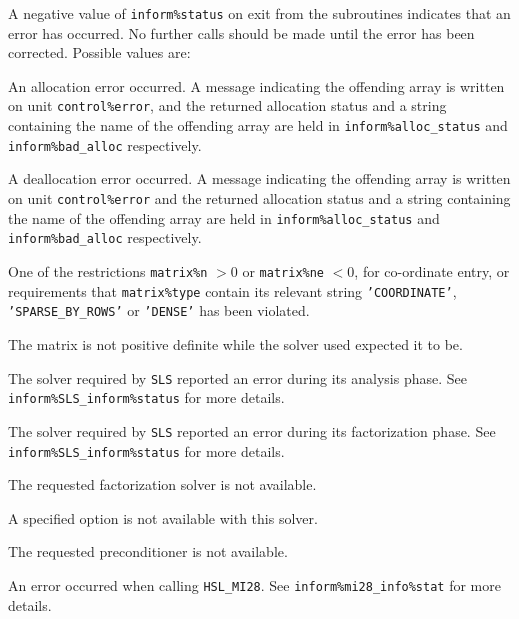 \documentclass{galahad}
\begin{document}

\galerrors
A negative value of {\tt inform\%status} on exit from the subroutines
indicates that an error has occurred. No further calls should be made
until the error has been corrected. Possible values are:

\begin{description}

\itt{\galerrallocate} An allocation error occurred. A message indicating
the offending
array is written on unit {\tt control\%error}, and the returned allocation
status and a string containing the name of the offending array
are held in {\tt inform\%alloc\_\-status}
and {\tt inform\%bad\_alloc} respectively.

\itt{\galerrdeallocate} A deallocation error occurred.
A message indicating the offending
array is written on unit {\tt control\%error} and the returned allocation
status and a string containing the name of the offending array
are held in {\tt inform\%alloc\_\-status}
and {\tt inform\%bad\_alloc} respectively.

\itt{\galerrrestrictions} One of the restrictions
 {\tt matrix\%n} $> 0$ or
 {\tt matrix\%ne} $< 0$, for co-ordinate entry,
  or requirements that {\tt matrix\%type}
  contain its relevant string
{\tt 'COORDINATE'}, {\tt 'SPARSE\_BY\_ROWS'} or   {\tt 'DENSE'}
  has been violated.

\itt{\galerrinertia} The matrix is not positive definite while the solver
  used expected it to be.

\itt{\galerranalysis} The solver required by {\tt SLS} reported an
  error during its analysis phase. 
  See {\tt inform\%SLS\_inform\%status} for more details.

\itt{\galerrfactorization} The solver required by {\tt SLS} reported an
  error during its factorization phase. 
  See {\tt inform\%SLS\_inform\%status} for more details.

\itt{\galunknownsolver} The requested factorization solver is not available.

\itt{\galerrunavailable} A specified option is not available with this solver.

\itt{\galerrunknownprecond} The requested preconditioner is not available.
     
\itt{\galerrmitwentyeight} An error occurred when calling {\tt HSL\_MI28}. See
  {\tt inform\%mi28\_info\%stat} for more details.


\end{description}
\end{document}
